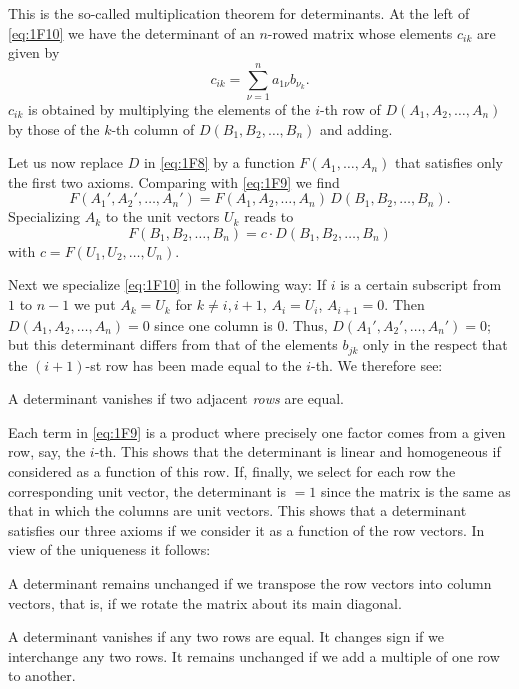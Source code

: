\documentclass[10pt,leqno]{article}
\theoremstyle{definition}
\begin{document}
This is the so-called multiplication theorem for determinants.
At the left of \eqref{eq:1F10} we have the determinant of an $n$-rowed matrix whose elements $c_{ik}$ are given by
\begin{equation}
\label{eq:1F11}
c_{ik} = \sum_{\nu=1}^n a_{1\nu} b_{\nu_k}.
\end{equation}
$c_{ik}$ is obtained by multiplying the elements of the $i$-th row of $D(A_1, A_2, \ldots, A_n)$ by those of the $k$-th column of $D(B_1, B_2, \ldots, B_n)$ and adding.

Let us now replace $D$ in \eqref{eq:1F8} by a function $F(A_1, \ldots, A_n)$ that satisfies only the first two axioms.
Comparing with \eqref{eq:1F9} we find
\[
F(A_1', A_2', \ldots, A_n')
= 
F(A_1, A_2, \ldots, A_n)
\,
D(B_1, B_2, \ldots, B_n).
\]
Specializing $A_k$ to the unit vectors $U_k$ reads to
\begin{equation}
\label{eq:1F12}
F(B_1, B_2, \ldots, B_n)
= c \cdot D(B_1, B_2, \ldots, B_n)
\end{equation}
with $c = F(U_1, U_2, \ldots, U_n)$.

Next we specialize \eqref{eq:1F10} in the following way:
If $i$ is a certain subscript from $1$ to $n-1$ we put $A_k = U_k$ for $k\not=i,i+1$, $A_i = U_i$, $A_{i+1} = 0$.
Then $D(A_1, A_2, \ldots, A_n) = 0$ since one column is $0$.
Thus, $D(A_1', A_2', \ldots, A_n') = 0$; but this determinant differs from that of the elements $b_{jk}$ only in the respect that the $(i+1)$-st row has been made equal to the $i$-th. We therefore see:

A determinant vanishes if two adjacent \emph{rows} are equal.

Each term in \eqref{eq:1F9} is a product where precisely one factor comes from a given row, say, the $i$-th.
This shows that the determinant is linear and homogeneous if considered as a function of this row.
If, finally, we select for each row the corresponding unit vector, the determinant is $= 1$ since the matrix is the same as that in which the columns are unit vectors.
This shows that a determinant satisfies our three axioms if we consider it as a function of the row vectors.
In view of the uniqueness it follows:

A determinant remains unchanged if we transpose the row vectors into column vectors, that is, if we rotate the matrix about its main diagonal.

A determinant vanishes if any two rows are equal.
It changes sign if we interchange any two rows.
It remains unchanged if we add a multiple of one row to another.
\end{document}
